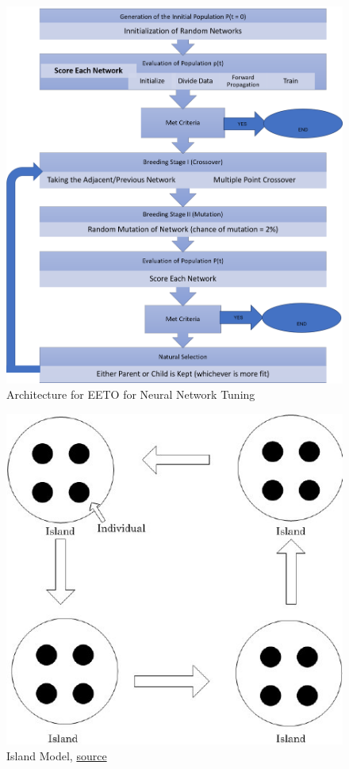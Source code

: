 \begin{figure}
	\centering
	\includegraphics[width=1.0\columnwidth]{introduction/fig3b.png}
	\caption{Architecture for EETO for Neural Network Tuning}
\end{figure}

\begin{figure}
	\centering
	\includegraphics[width=0.5\columnwidth]{introduction/fig3c.jpg}
	\caption{Island Model, \href{https://www.researchgate.net/publication/284723071_Parallel_Genetic_Algorithms_on_a_GPU_to_Solve_the_Travelling_Salesman_Problem/figures?lo=1}{source}}
\end{figure}


